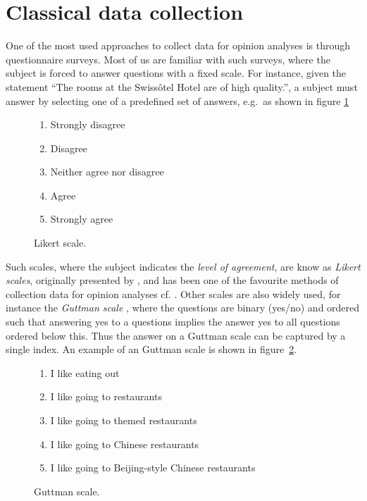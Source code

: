 \section{Classical data collection}
One of the most used approaches to collect data for opinion analyses is through questionnaire surveys. Most of us are familiar with such surveys, where the subject is forced to answer questions with a fixed scale. For instance, given the statement ``The rooms at the Swissôtel Hotel are of high quality.'', a subject must answer by selecting one of a predefined set of answers, e.g.\ as shown in figure \ref{fig:LikertScale}
\begin{figure}[ht]
	\begin{cframed}{.7\textwidth}
		\begin{enumerate}
		  \item Strongly disagree
		  \item Disagree
		  \item Neither agree nor disagree
		  \item Agree
		  \item Strongly agree
		\end{enumerate}
	\end{cframed}
	\caption{Likert scale.}
	\label{fig:LikertScale}
\end{figure}

Such scales, where the subject indicates the \emph{level of agreement}, are know as \emph{Likert scales}, originally presented by \citeauthor{Likert} , and has been one of the favourite methods of collection data for opinion analyses cf. \cite{?}. Other scales are also widely used, for instance the \emph{Guttman scale} \cite{?}, where the questions are  binary (yes/no) and ordered such that answering yes to a questions implies the answer yes to all questions ordered below this. Thus the answer on a Guttman scale can be captured by a single index. An example of an Guttman scale is shown in figure~\ref{fig:GuttmanScale}.
\begin{figure}[ht]
	\begin{cframed}{.7\textwidth}
		\begin{enumerate}
		  \item I like eating out
		  \item I like going to restaurants
		  \item I like going to themed restaurants
		  \item I like going to Chinese restaurants
		  \item I like going to Beijing-style Chinese restaurants
		\end{enumerate}
	\end{cframed}
	\caption{Guttman scale.}
	\label{fig:GuttmanScale}
\end{figure}

